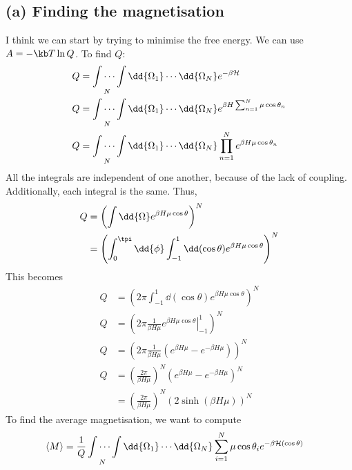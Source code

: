 \documentclass[../../PS3.tex]{subfiles}
\begin{document}
\subsection*{(a) Finding the magnetisation}
I think we can start by trying to minimise the free energy. We can use $A = -\kb T \ln{Q}$. To find $Q$:
\begin{align}
	Q &= \idotsint\limits_{N} \dd{\Omega_1} \dotsm  \dd{\Omega_N} e^{-\beta\ham} \\
	Q &= \idotsint\limits_{N} \dd{\Omega_1} \dotsm  \dd{\Omega_N} e^{\beta H \sum_{n = 1}^{N} \mu \cos{\theta_n}} \\
	Q &= \idotsint\limits_{N} \dd{\Omega_1} \dotsm  \dd{\Omega_N} \prod_{n=1}^{N} e^{\beta H\mu \cos{\theta_n}} 
\end{align}
All the integrals are independent of one another, because of the lack of coupling. Additionally, each integral is the same. Thus,
\begin{align}
	Q &= \left( \int \dd{\Omega}e^{\beta H\mu \cos{\theta}} \right)^{N} \\
	&= \left( \int_0^{\tpi} \dd{\phi} \int_{-1}^{1} \dd(\cos{\theta}) e^{\beta H\mu \cos{\theta}} \right)^{N}
\end{align}
This becomes
\begin{align}
	Q &= \left( 2 \pi \int_{-1}^{1} \dd(\cos{\theta}) e^{\beta H\mu \cos{\theta}} \right)^{N} \\
	Q &= \left( 2 \pi \frac{1}{\beta H \mu} \left. e^{\beta H\mu \cos{\theta}} \right|_{-1}^{1} \right)^{N} \\
	Q &= \left( 2 \pi \frac{1}{\beta H \mu} \left(e^{\beta H\mu} - e^{-\beta H \mu}\right) \right)^{N} \\ 
	Q &= \left( \frac{2 \pi }{\beta H \mu}\right)^N \left(e^{\beta H\mu} - e^{-\beta H \mu} \right)^{N} \\
	&= \left( \frac{2 \pi }{\beta H \mu}\right)^N \left(2\sinh(\beta H \mu) \right)^{N}
\end{align}
To find the average magnetisation, we want to compute 
\begin{align}
	\left< M \right> &= \frac{1}{Q} \idotsint\limits_{N} \dd{\Omega_1} \dotsm  \dd{\Omega_N} \sum_{i = 1}^N \mu \cos\theta_i  e^{-\beta\ham(\cos\theta)} 
\end{align}
\end{document}
